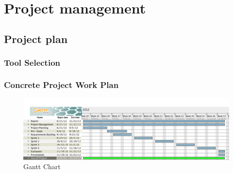 \chapter{Project management}

\section{Project plan}
\subsection{Tool Selection}

\subsection{Concrete Project Work Plan}

\begin{figure}
\centering
\includegraphics[width=6in]{image/gantt.png}
\caption{Gantt Chart}
\label{figure:gantt}
\end{figure}

